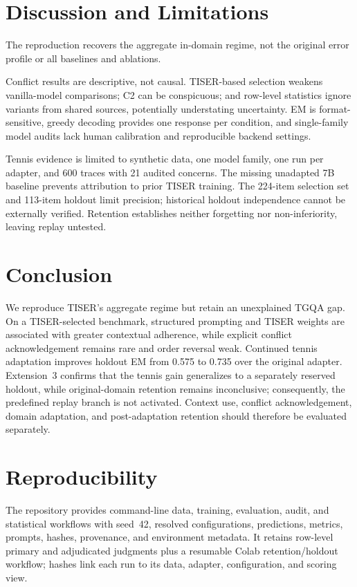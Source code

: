 \documentclass[conference]{IEEEtran}
\begin{document}
\section{Discussion and Limitations}

The reproduction recovers the aggregate in-domain regime, not the original error profile or all baselines and ablations.

Conflict results are descriptive, not causal. TISER-based selection weakens vanilla-model comparisons; C2 can be conspicuous; and row-level statistics ignore variants from shared sources, potentially understating uncertainty. EM is format-sensitive, greedy decoding provides one response per condition, and single-family model audits lack human calibration and reproducible backend settings.

Tennis evidence is limited to synthetic data, one model family, one run per adapter, and 600 traces with 21 audited concerns. The missing unadapted 7B baseline prevents attribution to prior TISER training. The 224-item selection set and 113-item holdout limit precision; historical holdout independence cannot be externally verified. Retention establishes neither forgetting nor non-inferiority, leaving replay untested.

\section{Conclusion}

We reproduce TISER's aggregate regime but retain an unexplained TGQA gap. On a TISER-selected benchmark, structured prompting and TISER weights are associated with greater contextual adherence, while explicit conflict acknowledgement remains rare and order reversal weak. Continued tennis adaptation improves holdout EM from 0.575 to 0.735 over the original adapter. Extension~3 confirms that the tennis gain generalizes to a separately reserved holdout, while original-domain retention remains inconclusive; consequently, the predefined replay branch is not activated. Context use, conflict acknowledgement, domain adaptation, and post-adaptation retention should therefore be evaluated separately.

\section{Reproducibility}

The repository provides command-line data, training, evaluation, audit, and statistical workflows with seed~42, resolved configurations, predictions, metrics, prompts, hashes, provenance, and environment metadata. It retains row-level primary and adjudicated judgments plus a resumable Colab retention/holdout workflow; hashes link each run to its data, adapter, configuration, and scoring view.
\end{document}
